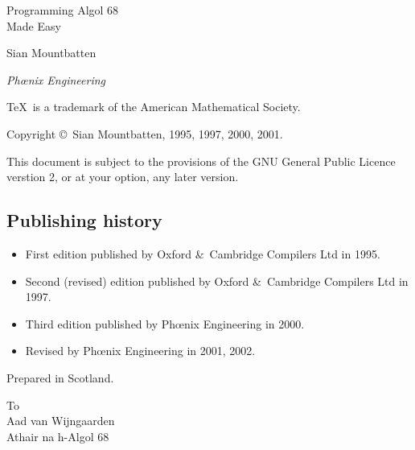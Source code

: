 %
\thispagestyle{empty}
\vglue 20mm
\begin{center}
\Huge Programming Algol 68\\ Made Easy
\end{center}
\vskip 10mm
\begin{center}
\Large Sian Mountbatten
\end{center}
\vfill
\begin{center}
\emph{Ph\oe{}nix Engineering}
\end{center}
\newpage
\thispagestyle{empty}
\parindent=0mm
\vfill
\small
\TeX\ is a trademark of the American Mathematical Society.\par
\smallskip
Copyright \copyright\ Sian Mountbatten, 1995, 1997, 2000, 2001.\par
\medskip
This document is subject to the provisions of the GNU General Public
Licence verstion 2, or at your option, any later version.\par
\bigskip
\subsection*{Publishing history}
\begin{itemize}
\item First edition published by Oxford \&\ Cambridge Compilers Ltd
in 1995.
\item Second (revised) edition published by Oxford \&\ Cambridge
Compilers Ltd in 1997.
\item Third edition published by Ph\oe{}nix Engineering in 2000.
\item Revised by Ph\oe{}nix Engineering in 2001, 2002.
\end{itemize}
\vfill
Prepared in Scotland.
\newpage
\thispagestyle{empty}
\vglue 40mm
\begin{flushright}
\textsf To\\
\medskip
\Large Aad van Wijngaarden\\
\bigskip\medskip
\normalsize Athair na h-Algol 68
\end{flushright}
\newpage
